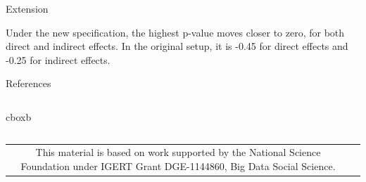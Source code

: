 \documentclass[final]{beamer}
\newlength{\onecolwid}
\newlength{\onecolwidd}
\begin{document}
\begin{frame}[t]
\begin{columns}[t]
\begin{column}{\onecolwidd}
\begin{block}{Extension}
\begin{rmfamily}
	\hspace{2cm}
	Under the new specification, the highest p-value moves closer to zero, for both direct and indirect effects. In the original setup, it is -0.45 for direct effects and -0.25 for indirect effects.
		
	\end{rmfamily}						
	\end{block}
	

	\begin{block}{References}
	
	
	\end{block}	
	
	
	
	
	
	\end{column}
	
	

		
	\end{columns}
	
	
	\hspace*{.5in} \begin{beamercolorbox}[wd=50.75in,colsep=0.15cm]{cboxb}\end{beamercolorbox}
	
	\begin{columns}
		

		
			
		
		
		
		\begin{column}{0.25\paperwidth}

	\centering
		\begin{tabular}{cc}

 \begin{minipage}{6.5in}
 \bigskip
This material is based on work supported by the National Science Foundation under IGERT Grant DGE-1144860, Big Data Social Science.



\end{minipage}
\end{tabular}
\end{column}
\end{columns}
\end{frame}
\end{document}
